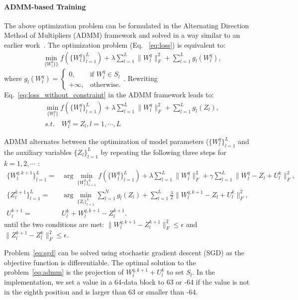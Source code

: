 \documentclass{article}
\begin{document}
\paragraph{ADMM-based Training}
The above optimization problem can be formulated in the Alternating  Direction  Method  of  Multipliers (ADMM) framework and solved in a way similar to an earlier work~\cite{zhang2018systematic}. 
The optimization problem (Eq. ~\ref{eq:loss}) is equivalent to:
\begin{align}
    & \min_{\{W_l^q\}\}} f(\{W_l^q\}_{l=1}^{L}) + \lambda \sum_{l=1}^L\|W_l^q\|_F^2 + \sum_{l=1}^{L}{g_l(W_l^q)}, \label{eq:loss_without_constraint}
\end{align}
where $g_l(W_l^q) = \begin{cases}
    0,& \text{if } W_l^q \in S_l\\
    +\infty,              & \text{otherwise}.
\end{cases}$. 
Rewriting Eq.~\ref{eq:loss_without_constraint} in the ADMM framework leads to:
\begin{align}
    & \min_{\{W_l^q\}} f(\{W_l^q\}_{l=1}^{L}) + \lambda \sum_{l=1}^L\|W_l^q\|_F^2 + \sum_{l=1}^{L}{g_l(Z_l)}, \\
    & s.t. \quad W_l^q = Z_l, l = 1, \cdots, L 
\end{align}

ADMM alternates between the optimization of model parameters ($\{W_l^q\}_{l=1}^L$ and the auxiliary variables $\{Z_l\}_{l=1}^L$ by repeating the following three steps for $k=1, 2, \cdots$ :
\begin{align}
    \{W_l^{q, k+1}\}_{l=1}^L = & \arg\min_{\{W_l^q\}_{l=1}^L} f(\{W_l^q\}_{l=1}^L)  + \lambda \sum_{l=1}^L\|W_l^q\|_F^2 + \gamma \sum_{l=1}^{L}{\|W_l^q - Z_l + U_l^k\|_F^2}, \label{eq:sgd}\\
    \{Z_l^{k+1}\}_{l=1}^L = & \arg \min_{\{Z_l\}_{l=1}^L} \sum_{l=1}^{N} g_l(Z_l) + \sum_{l=1}^{L}\frac{\lambda}{2}{\|W_l^{q, k+1} - Z_l + U_l^k\|_F^2}, \label{eq:admm} \\
    U_l^{k+1} = & U_l^{k} + W_l^{q, k+1} - Z_l^{k+1}.
\end{align}
until the two conditions are met: $\|W_l^{q, k+1} - Z_l^{k+1}\|_F^2 \leq \epsilon$ and $\|Z_l^{k+1} - Z_l^{k}\|_F^2 \leq \epsilon$.  


Problem~\ref{eq:sgd} can be solved using stochastic gradient descent (SGD) as the objective function is differentiable. The optimal solution to the problem~\ref{eq:admm} is the projection of $W_l^{q, k+1} + U_l^k$ to set $S_l$. In the implementation, we set a value in a 64-data block to 63 or -64 if the value is not in the eighth position and is larger than 63 or smaller than -64.  
\end{document}
